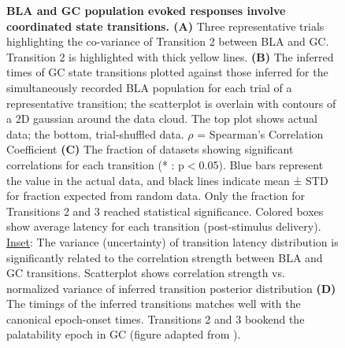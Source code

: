 \begin{refsection}
\begin{figure}
\caption{\textbf{BLA and GC population evoked responses involve coordinated state transitions. (A)} Three representative trials highlighting the co-variance of Transition 2 between BLA and GC. Transition 2 is highlighted with thick yellow lines. \textbf{(B)} The inferred times of GC state transitions plotted against those inferred for the simultaneously recorded BLA population for each trial of a representative transition; the scatterplot is overlain with contours of a 2D gaussian around the data cloud. The top plot shows actual data; the bottom, trial-shuffled data. $\rho$ = Spearman’s Correlation Coefficient \textbf{(C)} The fraction of datasets showing significant correlations for each transition (* : p\(<\)0.05). Blue bars represent the value in the actual data, and black lines indicate mean ± STD for fraction expected from random data. Only the fraction for Transitions 2 and 3 reached statistical significance. Colored boxes show average latency for each transition (post-stimulus delivery). \underline{Inset}: The variance (uncertainty) of transition latency distribution is significantly related to the correlation strength between BLA and GC transitions. Scatterplot shows correlation strength vs. normalized variance of inferred transition posterior distribution \textbf{(D)} The timings of the inferred transitions matches well with the canonical epoch-onset times. Transitions 2 and 3 bookend the palatability epoch in GC (figure adapted from \cite{fontanini2009a}).}
\label{fig:wrapfig}
\end{figure}


\end{refsection}
